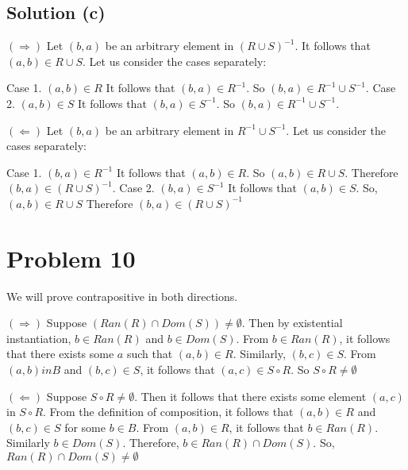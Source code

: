 \documentclass{article}
\begin{document}
\subsection{Solution (c)}

$(\Rightarrow)$ Let $(b,a)$ be an arbitrary element in $(R \cup
S)^{-1}$. It follows that $(a,b) \in R \cup S$. Let us consider the
cases separately:

Case 1. $(a,b) \in R$ It follows that $(b,a) \in R^{-1}$. So $(b,a)
\in R^{-1} \cup S^{-1}$.
Case 2. $(a,b) \in S$ It follows that $(b,a) \in S^{-1}$. So $(b,a)
\in R^{-1} \cup S^{-1}$.

$(\Leftarrow)$ Let $(b,a)$ be an arbitrary element in $R^{-1} \cup
S^{-1}$. Let us consider the cases separately:

Case 1. $(b,a) \in R^{-1}$ It follows that $(a,b) \in R$. So $(a,b)
\in R \cup S$. Therefore $(b,a) \in (R \cup S)^{-1}$.
Case 2. $(b,a) \in S^{-1}$ It follows that $(a,b) \in S$. So, $(a,b)
\in R \cup S$ Therefore $(b,a) \in (R \cup S)^{-1}$

\section{Problem 10}

We will prove contrapositive in both directions.

$(\Rightarrow)$ Suppose $(Ran(R) \cap Dom(S)) \neq \emptyset$. Then by
existential instantiation, $b \in Ran(R)$ and $b \in Dom(S)$. From $b
\in Ran(R)$, it follows that there exists some $a$ such that $(a,b)
\in R$. Similarly, $(b,c) \in S$. From $(a,b)in B$ and $(b,c) \in S$,
it follows that $(a,c) \in S \circ R$. So $S \circ R \neq \emptyset$ 

$(\Leftarrow)$ Suppose $S \circ R \neq \emptyset$. Then it follows
that there exists some element $(a,c)$ in $S \circ R$. From the
definition of composition, it follows that $(a,b) \in R$ and $(b,c)
\in S$ for some $b \in B$. From $(a,b) \in R$, it follows that $b \in
Ran(R)$. Similarly $b \in Dom(S)$. Therefore, $b \in Ran(R) \cap
Dom(S)$. So, $Ran (R) \cap Dom(S) \neq \emptyset$
\end{document}

